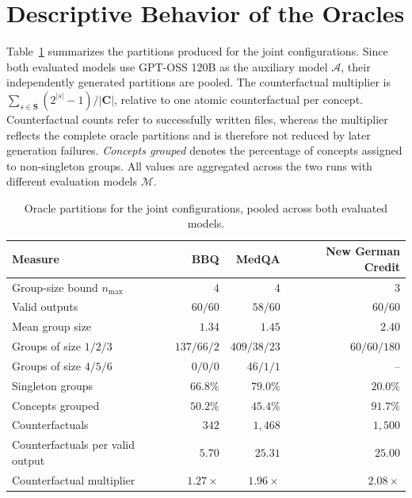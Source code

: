 \section{Descriptive Behavior of the Oracles}
\label{sec:results-oracle-behavior}

Table~\ref{tab:oracle-summary} summarizes the partitions produced for the joint configurations. Since both evaluated models use GPT-OSS 120B as the auxiliary model $\mathcal{A}$, their independently generated partitions are pooled. The counterfactual multiplier is $\sum_{s\in\mathbf{S}}(2^{|s|}-1)/|\mathbf{C}|$, relative to one atomic counterfactual per concept. Counterfactual counts refer to successfully written files, whereas the multiplier reflects the complete oracle partitions and is therefore not reduced by later generation failures. \emph{Concepts grouped} denotes the percentage of concepts assigned to non-singleton groups. All values are aggregated across the two runs with different evaluation models $\mathcal{M}$.

\begin{table}[htb]
  \centering
  \caption[Oracle partitions for the joint configurations]{Oracle partitions for the joint configurations, pooled across both evaluated models.}
  \label{tab:oracle-summary}
  \small
  \setlength{\tabcolsep}{6pt}
  \renewcommand{\arraystretch}{1.1}
  \begin{tabular}{@{}lrrr@{}}
    \hline
    \textbf{Measure}           & \textbf{BBQ}    & \textbf{MedQA}    & \textbf{New German Credit} \\
    \hline
    Group-size bound $n_{\max}$ & $4$             & $4$               & $3$                        \\
    Valid outputs              & $60/60$         & $58/60$           & $60/60$                    \\
    Mean group size            & $1.34$          & $1.45$            & $2.40$                     \\
    Groups of size $1/2/3$     & $137/66/2$      & $409/38/23$       & $60/60/180$                \\
    Groups of size $4/5/6$     & $0/0/0$         & $46/1/1$          & --                         \\
    Singleton groups           & $66.8\%$        & $79.0\%$          & $20.0\%$                   \\
    Concepts grouped           & $50.2\%$        & $45.4\%$          & $91.7\%$                   \\
    Counterfactuals            & $342$           & $1{,}468$         & $1{,}500$                  \\
    Counterfactuals per valid output & $5.70$     & $25.31$           & $25.00$                    \\
    Counterfactual multiplier  & $1.27\times$    & $1.96\times$      & $2.08\times$               \\
    \hline
  \end{tabular}
\end{table}

